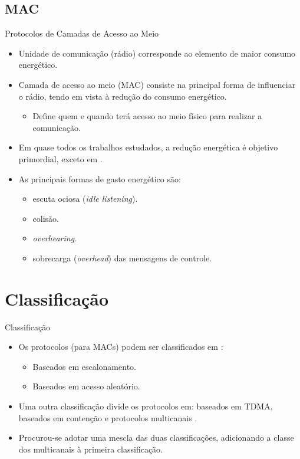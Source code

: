 \documentclass{beamer}
\begin{document}
\subsection{MAC}
\begin{frame}[allowframebreaks]{Protocolos de Camadas de Acesso ao Meio}
  \begin{itemize}
    \item
      Unidade de comunicação (rádio) corresponde ao elemento de maior consumo energético.
    \item
      Camada de acesso ao meio (MAC) consiste na principal forma de influenciar o rádio, tendo em vista à redução do consumo energético.
      \begin{itemize}
       \item Define quem e quando terá acesso ao meio físico para realizar a comunicação.
      \end{itemize}
    \item
      Em quase todos os trabalhos estudados, a redução energética é objetivo primordial, exceto em \cite{20093812310364}.
    \item
      As principais formas de gasto energético são:
      \begin{itemize}
       \item escuta ociosa (\emph{idle listening}).
	\item colisão.
	\item \emph{overhearing}.
	\item sobrecarga (\emph{overhead}) das mensagens de controle.
      \end{itemize}
  \end{itemize}
\end{frame}


\section{Classificação}
\begin{frame}{Classificação}
  \begin{itemize}
    \item
      Os protocolos (para MACs) podem ser classificados em \cite{kredo07}:
	\begin{itemize}
	  \item Baseados em escalonamento.
	  \item Baseados em acesso aleatório.
	\end{itemize}
    \item Uma outra classificação divide os protocolos em: baseados em TDMA, baseados em contenção e protocolos multicanais \cite{20084511683228}.
    \item Procurou-se adotar uma mescla das duas classificações, adicionando a classe dos multicanais à primeira classificação.
  \end{itemize}
\end{frame}
\end{document}
